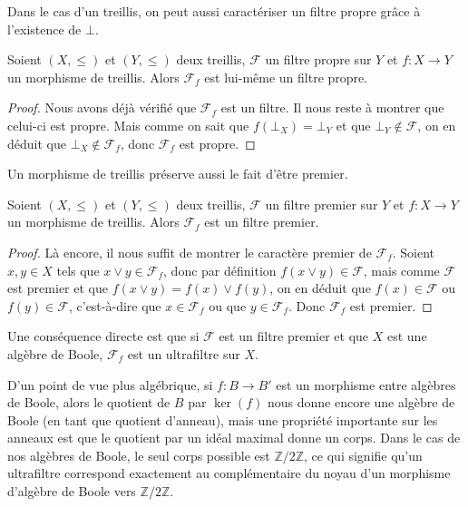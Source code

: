 Dans le cas d'un treillis, on peut aussi caractériser un filtre propre grâce à
l'existence de $\bot$.

\begin{property}
  Soient $(X,\leq)$ et $(Y,\leq)$ deux treillis, $\mathcal F$ un filtre propre
  sur $Y$ et $f : X \to Y$ un morphisme de treillis. Alors $\mathcal F_f$ est
  lui-même un filtre propre.
\end{property}

\begin{proof}
  Nous avons déjà vérifié que $\mathcal F_f$ est un filtre. Il nous reste à
  montrer que celui-ci est propre. Mais comme on sait que $f(\bot_X)=\bot_Y$
  et que $\bot_Y\notin\mathcal F$, on en déduit que $\bot_X\notin\mathcal F_f$,
  donc $\mathcal F_f$ est propre.
\end{proof}

Un morphisme de treillis préserve aussi le fait d'être premier.

\begin{property}
  Soient $(X,\leq)$ et $(Y,\leq)$ deux treillis, $\mathcal F$ un filtre premier
  sur $Y$ et $f : X \to Y$ un morphisme de treillis. Alors $\mathcal F_f$ est un
  filtre premier.
\end{property}

\begin{proof}
  Là encore, il nous suffit de montrer le caractère premier de $\mathcal F_f$.
  Soient $x,y\in X$ tels que $x\lor y \in \mathcal F_f$, donc par définition
  $f(x\lor y)\in \mathcal F$, mais comme $\mathcal F$ est premier et que
  $f(x\lor y) = f(x)\lor f(y)$, on en déduit que $f(x)\in\mathcal F$ ou
  $f(y)\in\mathcal F$, c'est-à-dire que $x\in\mathcal F_f$ ou que
  $y\in\mathcal F_f$. Donc $\mathcal F_f$ est premier.
\end{proof}

Une conséquence directe est que si $\mathcal F$ est un filtre premier et que $X$
est une algèbre de Boole, $\mathcal F_f$ est un ultrafiltre sur $X$.

D'un point de vue plus algébrique, si $f : B \to B'$ est un morphisme entre
algèbres de Boole, alors le quotient de $B$ par $\ker(f)$ nous donne encore une
algèbre de Boole (en tant que quotient d'anneau), mais une propriété importante
sur les anneaux est que le quotient par un idéal maximal donne un corps. Dans le
cas de nos algèbres de Boole, le seul corps possible est $\mathbb Z/2\mathbb Z$,
ce qui signifie qu'un ultrafiltre correspond exactement au complémentaire du
noyau d'un morphisme d'algèbre de Boole vers $\mathbb Z/2\mathbb Z$.

